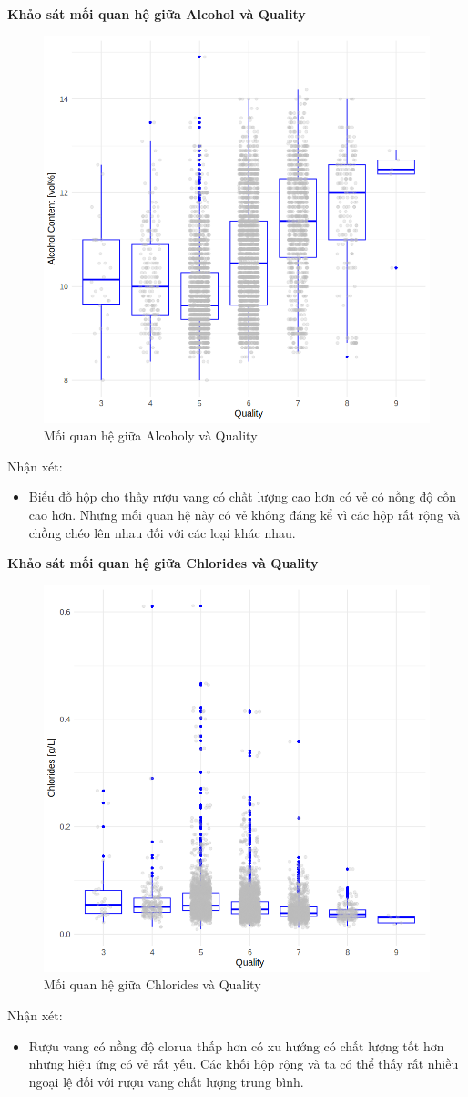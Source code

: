 \textbf{Khảo sát mối quan hệ giữa Alcohol và Quality}
\begin{figure}[H]
    \centering
    \includegraphics[width=0.75\columnwidth]{wine_colors/wine_alcohol_quality.png}
    \caption{Mối quan hệ giữa Alcoholy và Quality}
    \label{fig:wine_alcohol_quality}
\end{figure}
Nhận xét:
\begin{itemize}
    \item Biểu đồ hộp cho thấy rượu vang có chất lượng cao hơn có vẻ có nồng độ cồn cao hơn. Nhưng mối quan hệ này có vẻ không đáng kể vì các hộp rất rộng và chồng chéo lên nhau đối với các loại khác nhau.
\end{itemize}

\textbf{Khảo sát mối quan hệ giữa Chlorides và Quality}
\begin{figure}[H]
    \centering
    \includegraphics[width=0.75\columnwidth]{wine_colors/wine_chlorides_quality.png}
    \caption{Mối quan hệ giữa Chlorides và Quality}
    \label{fig:wine_chlorides_quality}
\end{figure}
Nhận xét:
\begin{itemize}
    \item Rượu vang có nồng độ clorua thấp hơn có xu hướng có chất lượng tốt hơn nhưng hiệu ứng có vẻ rất yếu. Các khối hộp rộng và ta có thể thấy rất nhiều ngoại lệ đối với rượu vang chất lượng trung bình.
\end{itemize}

